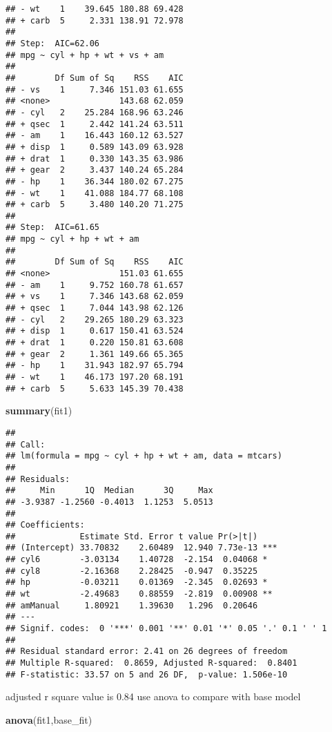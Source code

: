 \documentclass[
]{article}
\newenvironment{Shaded}{\begin{snugshade}}{\end{snugshade}}
\newcommand{\KeywordTok}[1]{\textcolor[rgb]{0.13,0.29,0.53}{\textbf{#1}}}
\newcommand{\NormalTok}[1]{#1}
\begin{document}
\begin{verbatim}
## - wt    1    39.645 180.88 69.428
## + carb  5     2.331 138.91 72.978
## 
## Step:  AIC=62.06
## mpg ~ cyl + hp + wt + vs + am
## 
##        Df Sum of Sq    RSS    AIC
## - vs    1     7.346 151.03 61.655
## <none>              143.68 62.059
## - cyl   2    25.284 168.96 63.246
## + qsec  1     2.442 141.24 63.511
## - am    1    16.443 160.12 63.527
## + disp  1     0.589 143.09 63.928
## + drat  1     0.330 143.35 63.986
## + gear  2     3.437 140.24 65.284
## - hp    1    36.344 180.02 67.275
## - wt    1    41.088 184.77 68.108
## + carb  5     3.480 140.20 71.275
## 
## Step:  AIC=61.65
## mpg ~ cyl + hp + wt + am
## 
##        Df Sum of Sq    RSS    AIC
## <none>              151.03 61.655
## - am    1     9.752 160.78 61.657
## + vs    1     7.346 143.68 62.059
## + qsec  1     7.044 143.98 62.126
## - cyl   2    29.265 180.29 63.323
## + disp  1     0.617 150.41 63.524
## + drat  1     0.220 150.81 63.608
## + gear  2     1.361 149.66 65.365
## - hp    1    31.943 182.97 65.794
## - wt    1    46.173 197.20 68.191
## + carb  5     5.633 145.39 70.438
\end{verbatim}

\begin{Shaded}
\begin{Highlighting}[]
\KeywordTok{summary}\NormalTok{(fit1)}
\end{Highlighting}
\end{Shaded}

\begin{verbatim}
## 
## Call:
## lm(formula = mpg ~ cyl + hp + wt + am, data = mtcars)
## 
## Residuals:
##     Min      1Q  Median      3Q     Max 
## -3.9387 -1.2560 -0.4013  1.1253  5.0513 
## 
## Coefficients:
##             Estimate Std. Error t value Pr(>|t|)    
## (Intercept) 33.70832    2.60489  12.940 7.73e-13 ***
## cyl6        -3.03134    1.40728  -2.154  0.04068 *  
## cyl8        -2.16368    2.28425  -0.947  0.35225    
## hp          -0.03211    0.01369  -2.345  0.02693 *  
## wt          -2.49683    0.88559  -2.819  0.00908 ** 
## amManual     1.80921    1.39630   1.296  0.20646    
## ---
## Signif. codes:  0 '***' 0.001 '**' 0.01 '*' 0.05 '.' 0.1 ' ' 1
## 
## Residual standard error: 2.41 on 26 degrees of freedom
## Multiple R-squared:  0.8659, Adjusted R-squared:  0.8401 
## F-statistic: 33.57 on 5 and 26 DF,  p-value: 1.506e-10
\end{verbatim}

adjusted r square value is 0.84 use anova to compare with base model

\begin{Shaded}
\begin{Highlighting}[]
\KeywordTok{anova}\NormalTok{(fit1,base_fit)}
\end{Highlighting}
\end{Shaded}
\end{document}
